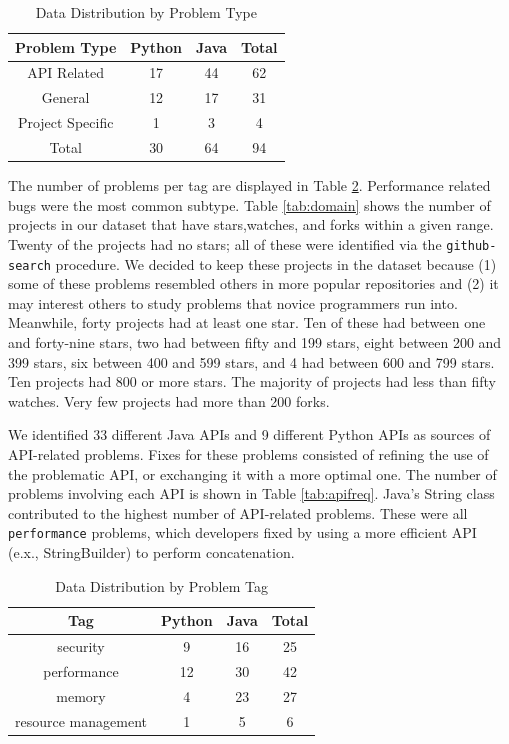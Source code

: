 \documentclass[sigconf]{acmart}
\begin{document}
\begin{table}

  \caption{Data Distribution by Problem Type}
  \label{tab:type}
\begin{tabular}{ c c c c }
  \toprule
  Problem Type & Python & Java & Total \\
  \midrule
  API Related       &	17  &  44 &  62\\
  General    		&	12  &  17 &  31\\
  Project Specific  &	 1  &   3 &   4\\
  \midrule
  Total      		&	30  &  64 &  94\\
  \bottomrule
\end{tabular}
\end{table}

The number of problems per tag are displayed in Table \ref{tab:tag}. Performance related bugs were the most common subtype. Table \ref{tab:domain} shows the number of projects in our dataset that have stars,watches, and forks within a given range. Twenty of the projects had no stars; all of these were identified via the \texttt{github-search} procedure. We decided to keep these projects in the dataset because (1) some of these problems resembled others in more popular repositories and (2) it may interest others to study problems that novice programmers run into. Meanwhile, forty projects had at least one star. Ten of these had between one and forty-nine stars, two had between fifty and 199 stars, eight between 200 and 399 stars, six between 400 and 599 stars, and 4 had between 600 and 799 stars. Ten projects had 800 or more stars. The majority of projects had less than fifty watches. Very few projects had more than 200 forks.

We identified 33 different Java APIs and 9 different Python APIs as sources of API-related problems. Fixes for these problems consisted of refining the use of the problematic API, or exchanging it with a more optimal one. The number of problems involving each API is shown in Table \ref{tab:apifreq}. Java's String class contributed to the highest number of API-related problems. These were all \texttt{performance} problems, which developers fixed by using a more efficient API (e.x., StringBuilder) to perform concatenation.
\begin{table}
  \caption{Data Distribution by Problem Tag}
  \label{tab:tag}
\begin{tabular}{  c c c c }
  \toprule
  Tag  				&Python &Java & Total\\
  \midrule
  security				& 9 &16 &25 \\
  performance			&12 &30 &42 \\
  memory				& 4 &23 &27 \\
  resource management	& 1 & 5&  6 \\
  \bottomrule
\end{tabular}
\end{table}
\end{document}
